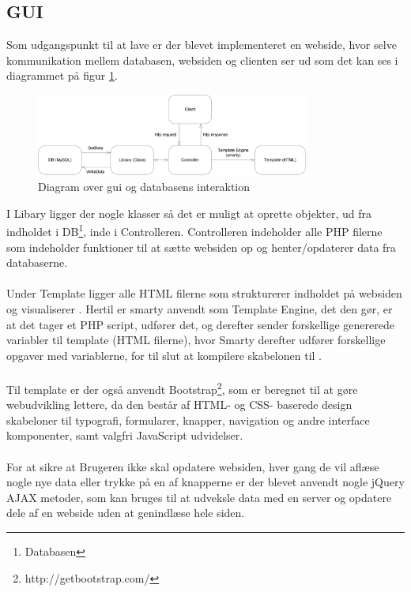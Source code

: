 \subsection{GUI}
Som udgangspunkt til at lave  er der blevet implementeret en webside, hvor selve kommunikation mellem databasen, websiden og clienten ser ud som det kan ses i diagrammet på figur \ref{fig:web}.

\begin{figure}[H]
    \centering
    \includegraphics[width=0.8\textwidth]{SoftwareArkitektur/GUI/Intro_GUI_DB/photo/webDiagram.PNG}
    \caption{Diagram over gui og databasens interaktion}
    \label{fig:web}
\end{figure}

I Libary ligger der nogle klasser så det er muligt at oprette objekter, ud fra indholdet i DB\footnote{Databasen}, inde i Controlleren. Controlleren indeholder alle PHP filerne som indeholder funktioner til at sætte websiden op og henter/opdaterer data fra databaserne.
\\\\
Under Template ligger alle HTML filerne som strukturerer indholdet på websiden og visualiserer . Hertil er smarty anvendt som Template Engine, det den gør, er at det tager et PHP script, udfører det, og derefter sender forskellige genererede variabler til template (HTML filerne), hvor Smarty derefter udfører forskellige opgaver med variablerne, for til slut at kompilere skabelonen til .
\\\\
Til template er der også anvendt Bootstrap\footnote{http://getbootstrap.com/}, som er beregnet til at gøre webudvikling lettere, da den består af HTML- og CSS- baserede design skabeloner til typografi, formularer, knapper, navigation og andre interface komponenter, samt valgfri JavaScript udvidelser.
\\\\
For at sikre at Brugeren ikke skal opdatere websiden, hver gang de vil aflæse nogle nye data eller trykke på en af knapperne er der blevet anvendt nogle jQuery AJAX metoder, som kan bruges til at udveksle data med en server og opdatere dele af en webside uden at genindlæse hele siden.

